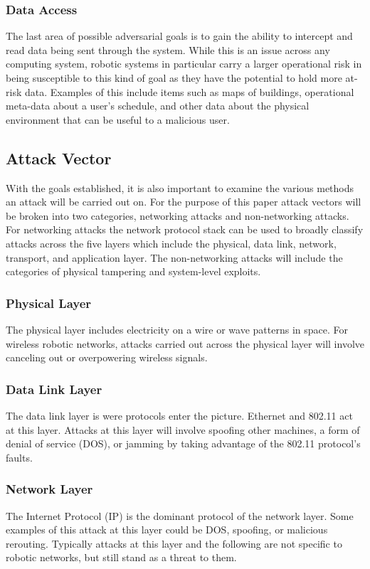 \subsubsection{Data Access}

The last area of possible adversarial goals is to gain the ability to intercept and read data being sent through the system. While this is an issue across any computing system, robotic systems in particular carry a larger operational risk in being susceptible to this kind of goal as they have the potential to hold more at-risk data. Examples of this include items such as maps of buildings, operational meta-data about a user's schedule, and other data about the physical environment that can be useful to a malicious user. 



\subsection{Attack Vector}
With the goals established, it is also important to examine the various methods an attack will be carried out on. For the purpose of this paper attack vectors will be broken into two categories, networking attacks and non-networking attacks. For networking attacks the network protocol stack can be used to broadly classify attacks across the five layers which include the physical, data link, network, transport, and application layer. The non-networking attacks will include the categories of physical tampering and system-level exploits.

\subsubsection{Physical Layer}
The physical layer includes electricity on a wire or wave patterns in space. For wireless robotic networks, attacks carried out across the physical layer will involve canceling out or overpowering wireless signals.

\subsubsection{Data Link Layer}
The data link layer is were protocols enter the picture. Ethernet and 802.11 act at this layer. Attacks at this layer will involve spoofing other machines, a form of denial of service (DOS), or jamming by taking advantage of the 802.11 protocol's faults.

\subsubsection{Network Layer}
The Internet Protocol (IP) is the dominant protocol of the network layer. Some examples of this attack at this layer could be DOS, spoofing, or malicious rerouting. Typically attacks at this layer and the following are not specific to robotic networks, but still stand as a threat to them. 

